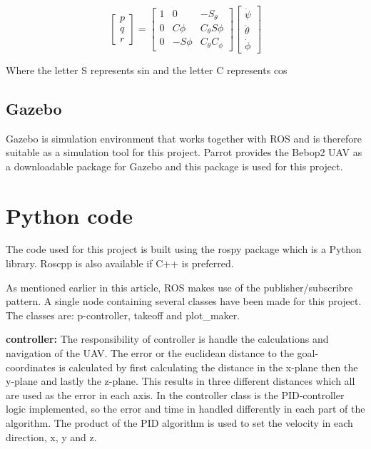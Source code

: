 \documentclass[conference]{IEEEtran}
\begin{document}
\begin{equation}
\begin{bmatrix}
p\\
q\\
r 
\end{bmatrix}=
\begin{bmatrix}
1 & 0 & -S_\theta\\
0 & C\phi & C_\theta S\phi \\
0 & -S\phi & C_\theta C_\phi
\end{bmatrix}
\begin{bmatrix}
\dot{\psi}\\
\dot{\theta}\\
\dot{\phi}
\end{bmatrix}\label{eq9}
\end{equation}

Where the letter S represents sin and the letter C represents cos \cite{b2}\cite{b3}
\newpage

\subsection{Gazebo}
Gazebo is simulation environment that works together with ROS and is therefore suitable as a simulation tool for this project. Parrot provides the Bebop2 UAV as a downloadable package for Gazebo and this package is used for this project.

\section{Python code}
The code used for this project is built using the rospy package which is a Python library. Roscpp is also available if C++ is preferred. 

As mentioned earlier in this article, ROS makes use of the publisher/subscribre pattern. A single node containing several classes have been made for this project. The classes are: p-controller, takeoff and plot\_maker. 

\textbf{controller:} The responsibility of controller is handle the calculations and navigation of the UAV. The error or the euclidean distance to the goal-coordinates is calculated by first calculating the distance in the x-plane then the y-plane and lastly the z-plane. This results in three different distances which all are used as the error in each axis. In the controller class is the PID-controller logic implemented, so the error and time in handled differently in each part of the algorithm. The product of the PID algorithm is used to set the velocity in each direction, x, y and z.
\end{document}
